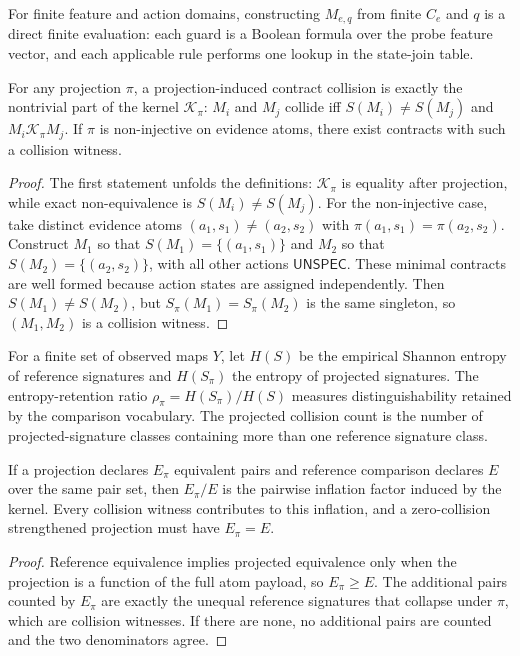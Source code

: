 For finite feature and action domains, constructing $M_{e,q}$ from finite $C_e$ and $q$ is a direct finite evaluation: each guard is a Boolean formula over the probe feature vector, and each applicable rule performs one lookup in the state-join table.

\begin{observation}
\label{thm:projection-kernel-loss}
For any projection $\pi$, a projection-induced contract collision is exactly the nontrivial part of the kernel $\mathcal{K}_\pi$: $M_i$ and $M_j$ collide iff $S(M_i)\ne S(M_j)$ and $M_i\mathcal{K}_\pi M_j$.  If $\pi$ is non-injective on evidence atoms, there exist contracts with such a collision witness.
\end{observation}
\begin{proof}
The first statement unfolds the definitions: $\mathcal{K}_\pi$ is equality after projection, while exact non-equivalence is $S(M_i)\ne S(M_j)$.  For the non-injective case, take distinct evidence atoms $(a_1,s_1)\ne(a_2,s_2)$ with $\pi(a_1,s_1)=\pi(a_2,s_2)$.  Construct $M_1$ so that $S(M_1)=\{(a_1,s_1)\}$ and $M_2$ so that $S(M_2)=\{(a_2,s_2)\}$, with all other actions $\mathsf{UNSPEC}$.  These minimal contracts are well formed because action states are assigned independently.  Then $S(M_1)\ne S(M_2)$, but $S_\pi(M_1)=S_\pi(M_2)$ is the same singleton, so $(M_1,M_2)$ is a collision witness.
\end{proof}

\begin{definition}
For a finite set of observed maps $Y$, let $H(S)$ be the empirical Shannon entropy of reference signatures and $H(S_\pi)$ the entropy of projected signatures.  The entropy-retention ratio $\rho_\pi=H(S_\pi)/H(S)$ measures distinguishability retained by the comparison vocabulary.  The projected collision count is the number of projected-signature classes containing more than one reference signature class.
\end{definition}

\begin{lemma}
If a projection declares $E_\pi$ equivalent pairs and reference comparison declares $E$ over the same pair set, then $E_\pi/E$ is the pairwise inflation factor induced by the kernel.  Every collision witness contributes to this inflation, and a zero-collision strengthened projection must have $E_\pi=E$.
\end{lemma}
\begin{proof}
Reference equivalence implies projected equivalence only when the projection is a function of the full atom payload, so $E_\pi\ge E$.  The additional pairs counted by $E_\pi$ are exactly the unequal reference signatures that collapse under $\pi$, which are collision witnesses.  If there are none, no additional pairs are counted and the two denominators agree.
\end{proof}

